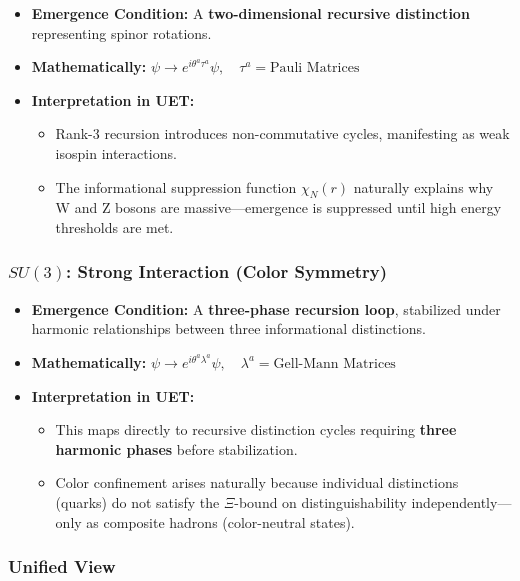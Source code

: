 \documentclass[12pt,a4paper]{article}
\begin{document}
\begin{itemize}
    \item \textbf{Emergence Condition:} A \textbf{two-dimensional recursive distinction} representing spinor rotations.
    \item \textbf{Mathematically:} \(\psi \to e^{i \theta^a \tau^a} \psi, \quad \tau^a = \text{Pauli Matrices}\)
    \item \textbf{Interpretation in UET:} 
    \begin{itemize}
        \item Rank-3 recursion introduces non-commutative cycles, manifesting as weak isospin interactions.
        \item The informational suppression function \(\chi_N(r)\) naturally explains why W and Z bosons are massive—emergence is suppressed until high energy thresholds are met.
    \end{itemize}
\end{itemize}

\subsubsection*{\(SU(3)\): Strong Interaction (Color Symmetry)}

\begin{itemize}
    \item \textbf{Emergence Condition:} A \textbf{three-phase recursion loop}, stabilized under harmonic relationships between three informational distinctions.
    \item \textbf{Mathematically:} \(\psi \to e^{i \theta^a \lambda^a} \psi, \quad \lambda^a = \text{Gell-Mann Matrices}\)
    \item \textbf{Interpretation in UET:} 
    \begin{itemize}
        \item This maps directly to recursive distinction cycles requiring \textbf{three harmonic phases} before stabilization.
        \item Color confinement arises naturally because individual distinctions (quarks) do not satisfy the \(\Xi\)-bound on distinguishability independently—only as composite hadrons (color-neutral states).
    \end{itemize}
\end{itemize}

\subsubsection*{Unified View}
\end{document}
